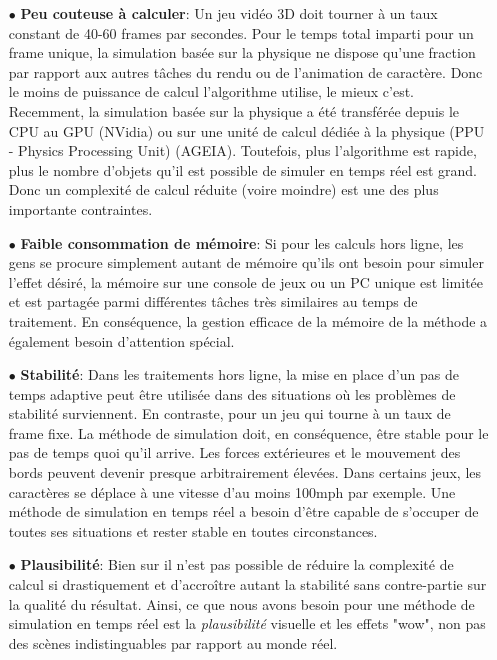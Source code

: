 \documentclass[11pt]{report}
\begin{document}
\begin{enumerate}
	\item[$\bullet$] \textbf{Peu couteuse à calculer}: Un jeu vidéo 3D doit tourner à un taux constant de 40-60 frames par secondes. Pour le temps total imparti pour un frame unique, la simulation basée sur la physique ne dispose qu'une fraction par rapport aux autres tâches du rendu ou de l'animation de caractère. Donc le moins de puissance de calcul l'algorithme utilise, le mieux c'est. Recemment, la simulation basée sur la physique a été transférée depuis le CPU au GPU (NVidia) ou sur une unité de calcul dédiée à la physique (PPU - Physics Processing Unit) (AGEIA). Toutefois, plus l'algorithme est rapide, plus le nombre d'objets qu'il est possible de simuler en temps réel est grand. Donc un complexité de calcul réduite (voire moindre) est une des plus importante contraintes. 
	
\item[$\bullet$] \textbf{Faible consommation de mémoire}: Si pour les calculs hors ligne, les gens se procure simplement autant de mémoire qu'ils ont besoin pour simuler l'effet désiré, la mémoire sur une console de jeux ou un PC unique est limitée et est partagée parmi différentes tâches très similaires au temps de traitement. En conséquence, la gestion efficace de la mémoire de la méthode a également besoin d'attention spécial.

\item[$\bullet$] \textbf{Stabilité}: Dans les traitements hors ligne, la mise en place d'un pas de temps adaptive peut être utilisée dans des situations où les problèmes de stabilité surviennent. En contraste, pour un jeu qui tourne à un taux de frame fixe. La méthode de simulation doit, en conséquence, être stable pour le pas de temps quoi qu'il arrive. Les forces extérieures et le mouvement des bords peuvent devenir presque arbitrairement élevées. Dans certains jeux, les caractères se déplace à une vitesse d'au moins 100mph par exemple. Une méthode de simulation en temps réel a besoin d'être capable de s'occuper de toutes ses situations et rester stable en toutes circonstances.

\item[$\bullet$] \textbf{Plausibilité}: Bien sur il  n'est pas possible de réduire la complexité de calcul si drastiquement et d'accroître autant la stabilité sans contre-partie sur la qualité du résultat. Ainsi, ce que nous avons besoin pour une méthode de simulation en temps réel est la \textit{plausibilité} visuelle et les effets "wow", non pas des scènes indistinguables par rapport au monde réel.

\end{enumerate}
\end{document}
